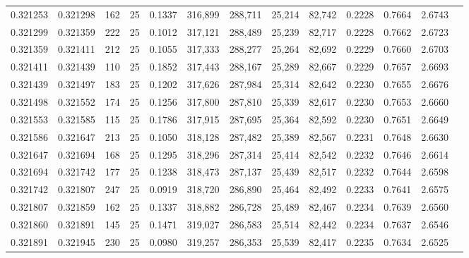 \begin{tabular}{rrrrrrrrrrrrr}
0.321253 & 0.321298 &   162 &  25 &                                     0.1337 & 316,899 & 288,711 &  25,214 &  82,742 & 0.2228 & 0.7664 & 2.6743 \\
0.321299 & 0.321359 &   222 &  25 &                                     0.1012 & 317,121 & 288,489 &  25,239 &  82,717 & 0.2228 & 0.7662 & 2.6723 \\
0.321359 & 0.321411 &   212 &  25 &                                     0.1055 & 317,333 & 288,277 &  25,264 &  82,692 & 0.2229 & 0.7660 & 2.6703 \\
0.321411 & 0.321439 &   110 &  25 &                                     0.1852 & 317,443 & 288,167 &  25,289 &  82,667 & 0.2229 & 0.7657 & 2.6693 \\
0.321439 & 0.321497 &   183 &  25 &                                     0.1202 & 317,626 & 287,984 &  25,314 &  82,642 & 0.2230 & 0.7655 & 2.6676 \\
0.321498 & 0.321552 &   174 &  25 &                                     0.1256 & 317,800 & 287,810 &  25,339 &  82,617 & 0.2230 & 0.7653 & 2.6660 \\
0.321553 & 0.321585 &   115 &  25 &                                     0.1786 & 317,915 & 287,695 &  25,364 &  82,592 & 0.2230 & 0.7651 & 2.6649 \\
0.321586 & 0.321647 &   213 &  25 &                                     0.1050 & 318,128 & 287,482 &  25,389 &  82,567 & 0.2231 & 0.7648 & 2.6630 \\
0.321647 & 0.321694 &   168 &  25 &                                     0.1295 & 318,296 & 287,314 &  25,414 &  82,542 & 0.2232 & 0.7646 & 2.6614 \\
0.321694 & 0.321742 &   177 &  25 &                                     0.1238 & 318,473 & 287,137 &  25,439 &  82,517 & 0.2232 & 0.7644 & 2.6598 \\
0.321742 & 0.321807 &   247 &  25 &                                     0.0919 & 318,720 & 286,890 &  25,464 &  82,492 & 0.2233 & 0.7641 & 2.6575 \\
0.321807 & 0.321859 &   162 &  25 &                                     0.1337 & 318,882 & 286,728 &  25,489 &  82,467 & 0.2234 & 0.7639 & 2.6560 \\
0.321860 & 0.321891 &   145 &  25 &                                     0.1471 & 319,027 & 286,583 &  25,514 &  82,442 & 0.2234 & 0.7637 & 2.6546 \\
0.321891 & 0.321945 &   230 &  25 &                                     0.0980 & 319,257 & 286,353 &  25,539 &  82,417 & 0.2235 & 0.7634 & 2.6525 \\

\end{tabular}
